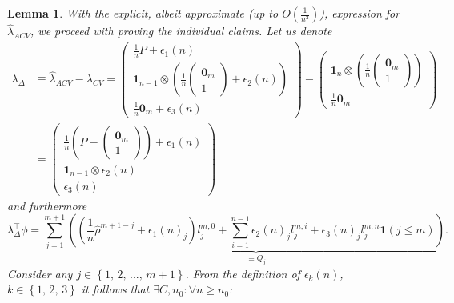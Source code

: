 \documentclass[11pt,dvipsnames]{article}
\newtheorem{lemma}{Lemma}
\begin{document}
\begin{appendices}
\begin{lemma}
With the explicit, albeit approximate (up to $ O(\frac{1}{n^{2}}) $), expression for $ \widehat{\lambda}_{ACV} $, we proceed with proving the individual claims. Let us denote
\begin{equation}
\begin{split}
\lambda_{\Delta} &\equiv \widehat{\lambda}_{ACV}-\lambda_{CV}=
\begin{pmatrix}
\frac{1}{n}P+\epsilon_{1}(n)\\
\mathbf{1}_{n-1} \otimes \left( 
\frac{1}{n}
\begin{pmatrix}
\mathbf{0}_{m}\\
1
\end{pmatrix}
+ \epsilon_{2}(n) \right)  \\
\frac{1}{n}
\mathbf{0}_{m}
+ \epsilon_{3}(n)
\end{pmatrix}-
\begin{pmatrix}
\mathbf{1}_{n} \otimes \left( 
\frac{1}{n}
\begin{pmatrix}
\mathbf{0}_{m}\\
1
\end{pmatrix} \right)  \\
\frac{1}{n}
\mathbf{0}_{m}
\end{pmatrix}\\
&=
\begin{pmatrix}
\frac{1}{n}\left( P- \begin{pmatrix}
\mathbf{0}_{m}\\
1
\end{pmatrix} \right) +\epsilon_{1}(n)\\
\mathbf{1}_{n-1} \otimes 
\epsilon_{2}(n)   \\
\epsilon_{3}(n)
\end{pmatrix}
\end{split}
\end{equation}
and furthermore
\begin{equation}
\lambda_{\Delta}^{\top}\phi=\sum_{j=1}^{m+1} \underbrace{\left(  \left( \frac{1}{n}\hat{\rho}^{m+1-j}+\epsilon_{1}(n)_{j}\right)l_{j}^{m,0} + \sum_{i=1}^{n-1} \epsilon_{2}(n)_{j}l_{j}^{m,i} + \epsilon_{3}(n)_{j}l_{j}^{m,n} \mathbf{1}(j\leq m)\right) }_{\equiv Q_{j}}.
\end{equation}
Consider any $j \in \left\lbrace 1,\,2,\,...,\,m+1 \right\rbrace$. From the definition of $ \epsilon_{k}(n) $, $ k \in \left\lbrace 1,\,2,\,3 \right\rbrace  $ it follows that $ \exists C, n_{0} : \forall n \geq n_{0} $:
\begin{equation}
\begin{split}

\end{split}
\end{equation}
\end{lemma}
\end{appendices}
\end{document}
